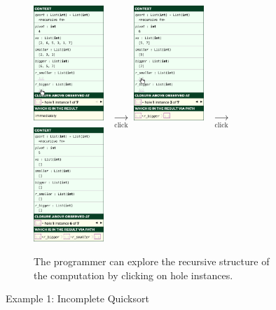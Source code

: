 \begin{figure}[t]
\begin{subfigure}[t]{\textwidth}
\centering
\includegraphics[width=0.29\textwidth,interpolate=false,valign=c]{images/qsort-new-sidebar-1.png}
~$\xrightarrow[\text{click}]{}$
\includegraphics[width=0.29\textwidth,interpolate=false,valign=c]{images/qsort-new-sidebar-2.png}
~$\xrightarrow[\text{click}]{}$
\includegraphics[width=0.29\textwidth,interpolate=false,valign=c]{images/qsort-new-sidebar-3.png}
\caption{The programmer can explore the recursive structure of the computation by clicking on hole instances.}
\label{fig:qsort-sidebars}
\end{subfigure}

\vspace{3px}

\caption{Example 1: Incomplete Quicksort}
\label{fig:qsort-cell-mockup}

\vspace{-5px}
\end{figure}

